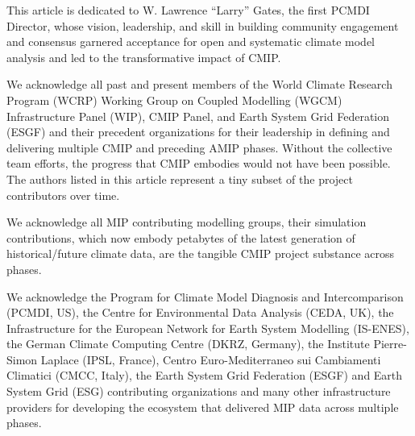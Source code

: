 \documentclass[gmd, preprint]{copernicus}
\begin{document}
\appendixfigures  %

\appendixtables   %







\begin{acknowledgements}
This article is dedicated to W. Lawrence ``Larry'' Gates, the first PCMDI Director, whose vision, leadership, and skill in building community engagement and consensus garnered acceptance for open and systematic climate model analysis and led to the transformative impact of CMIP.

We acknowledge all past and present members of the World Climate Research Program (WCRP) Working Group on Coupled Modelling (WGCM) Infrastructure Panel (WIP), CMIP Panel, and Earth System Grid Federation (ESGF) and their precedent organizations for their leadership in defining and delivering multiple CMIP and preceding AMIP phases. Without the collective team efforts, the progress that CMIP embodies would not have been possible. The authors listed in this article represent a tiny subset of the project contributors over time.

We acknowledge all MIP contributing modelling groups, their simulation contributions, which now embody petabytes of the latest generation of historical/future climate data, are the tangible CMIP project substance across phases.

We acknowledge the Program for Climate Model Diagnosis and Intercomparison (PCMDI, US), the Centre for Environmental Data Analysis (CEDA, UK), the Infrastructure for the European Network for Earth System Modelling (IS-ENES), the German Climate Computing Centre (DKRZ, Germany), the Institute Pierre-Simon Laplace (IPSL, France), Centro Euro-Mediterraneo sui Cambiamenti Climatici (CMCC, Italy), the Earth System Grid Federation (ESGF) and Earth System Grid (ESG) contributing organizations and many other infrastructure providers for developing the ecosystem that delivered MIP data across multiple phases.


\end{acknowledgements}
\end{document}
